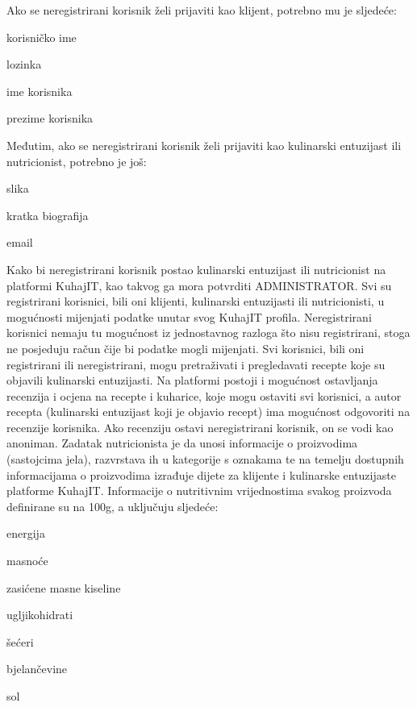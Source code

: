 		Ako se neregistrirani korisnik želi prijaviti kao klijent, potrebno mu je sljedeće:
		\begin{packed_item}
			\item korisničko ime
			\item lozinka
			\item ime korisnika
			\item prezime korisnika
		\end{packed_item}
		
		Međutim, ako se neregistrirani korisnik želi prijaviti kao kulinarski entuzijast ili nutricionist, potrebno je još:
		\begin{packed_item}
			\item slika
			\item kratka biografija
			\item email
		\end{packed_item}
		
		Kako bi neregistrirani korisnik postao kulinarski entuzijast ili nutricionist na platformi KuhajIT, kao takvog ga mora potvrditi ADMINISTRATOR.
				Svi su registrirani korisnici, bili oni klijenti, kulinarski entuzijasti ili nutricionisti, u mogućnosti mijenjati podatke unutar svog KuhajIT profila. Neregistrirani korisnici nemaju tu mogućnost iz jednostavnog razloga što nisu registrirani, stoga ne posjeduju račun čije bi podatke mogli mijenjati.
	Svi korisnici, bili oni registrirani ili neregistrirani, mogu pretraživati i pregledavati recepte koje su objavili kulinarski entuzijasti. Na platformi postoji i mogućnost ostavljanja recenzija i ocjena na recepte i kuharice, koje mogu ostaviti svi korisnici, a autor recepta (kulinarski entuzijast koji je objavio recept) ima mogućnost odgovoriti na recenzije korisnika. Ako recenziju ostavi neregistrirani korisnik, on se vodi kao anoniman.
	Zadatak nutricionista je da unosi informacije o proizvodima (sastojcima jela), razvrstava ih u kategorije s oznakama te na temelju dostupnih informacijama o proizvodima izrađuje dijete za klijente i kulinarske entuzijaste platforme KuhajIT.
	Informacije o nutritivnim vrijednostima svakog proizvoda definirane su na 100g, a uključuju sljedeće:
	\begin{packed_item}
		\item energija
		\item masnoće
		\item zasićene masne kiseline
		\item ugljikohidrati
		\item šećeri
		\item bjelančevine
		\item sol
	\end{packed_item}
	
